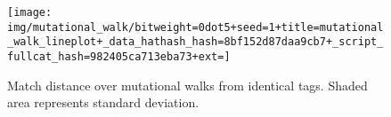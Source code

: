 \begin{sidewaysfigure}
\vspace{100ex}
\begin{center}
\texttt{[image: img/mutational\_walk/bitweight=0dot5+seed=1+title=mutational\_walk\_lineplot+\_data\_hathash\_hash=8bf152d87daa9cb7+\_script\_fullcat\_hash=982405ca713eba73+ext=]}
\caption{
Match distance over mutational walks from identical tags.
Shaded area represents standard deviation.
}
\label{fig:mutational_walk_lineplot}

\end{center}
\end{sidewaysfigure}
